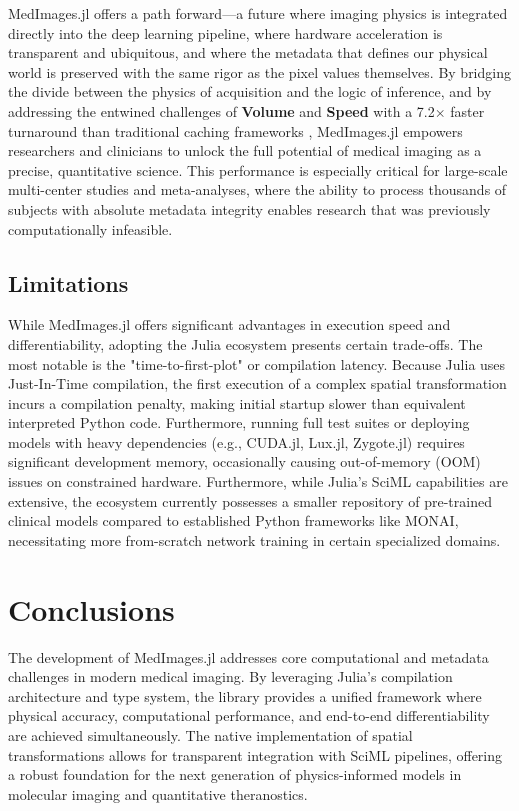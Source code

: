\documentclass[10pt,letterpaper]{article}
\begin{document}
MedImages.jl offers a path forward---a future where imaging physics is integrated directly into the deep learning pipeline, where hardware acceleration is transparent and ubiquitous, and where the metadata that defines our physical world is preserved with the same rigor as the pixel values themselves. By bridging the divide between the physics of acquisition and the logic of inference, and by addressing the entwined challenges of \textbf{Volume} and \textbf{Speed} with a 7.2$\times$ faster turnaround than traditional caching frameworks \cite{Shi_2023}, MedImages.jl empowers researchers and clinicians to unlock the full potential of medical imaging as a precise, quantitative science. This performance is especially critical for large-scale multi-center studies and meta-analyses, where the ability to process thousands of subjects with absolute metadata integrity enables research that was previously computationally infeasible.


\subsection{Limitations}
While MedImages.jl offers significant advantages in execution speed and differentiability, adopting the Julia ecosystem presents certain trade-offs. The most notable is the "time-to-first-plot" or compilation latency. Because Julia uses Just-In-Time compilation, the first execution of a complex spatial transformation incurs a compilation penalty, making initial startup slower than equivalent interpreted Python code. Furthermore, running full test suites or deploying models with heavy dependencies (e.g., CUDA.jl, Lux.jl, Zygote.jl) requires significant development memory, occasionally causing out-of-memory (OOM) issues on constrained hardware. Furthermore, while Julia's SciML capabilities are extensive, the ecosystem currently possesses a smaller repository of pre-trained clinical models compared to established Python frameworks like MONAI, necessitating more from-scratch network training in certain specialized domains.

\section{Conclusions}
The development of MedImages.jl addresses core computational and metadata challenges in modern medical imaging. By leveraging Julia's compilation architecture and type system, the library provides a unified framework where physical accuracy, computational performance, and end-to-end differentiability are achieved simultaneously. The native implementation of spatial transformations allows for transparent integration with SciML pipelines, offering a robust foundation for the next generation of physics-informed models in molecular imaging and quantitative theranostics.
\end{document}
